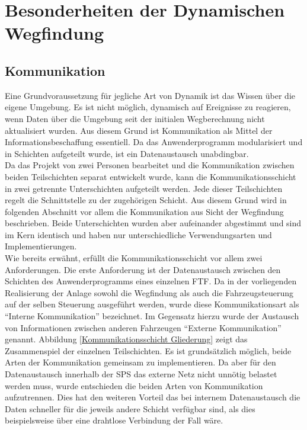 \chapter{Besonderheiten der Dynamischen Wegfindung}

\section{Kommunikation}
	\label{Kommunikation}
	Eine Grundvoraussetzung für jegliche Art von Dynamik ist das Wissen über die eigene Umgebung. Es ist nicht möglich, dynamisch auf Ereignisse zu reagieren, wenn Daten über die Umgebung seit der initialen Wegberechnung nicht aktualisiert wurden. Aus diesem Grund ist Kommunikation als Mittel der Informationsbeschaffung essentiell. Da das Anwenderprogramm modularisiert und in Schichten aufgeteilt wurde, ist ein Datenaustausch unabdingbar. 
	\\[4pt]
	Da das Projekt von zwei Personen bearbeitet und die Kommunikation zwischen beiden Teilschichten separat entwickelt wurde, kann die Kommunikationsschicht in zwei getrennte Unterschichten aufgeteilt werden. Jede dieser Teilschichten regelt die Schnittstelle zu der zugehörigen Schicht. Aus diesem Grund wird in folgenden Abschnitt vor allem die Kommunikation aus Sicht der Wegfindung beschrieben. Beide Unterschichten wurden aber aufeinander abgestimmt und sind im Kern identisch und haben nur unterschiedliche Verwendungsarten und Implementierungen.
	\\[4pt]
	Wie bereits erwähnt, erfüllt die Kommunikationsschicht vor allem zwei Anforderungen. Die erste Anforderung ist der Datenaustausch zwischen den Schichten des Anwenderprogramms eines einzelnen \ac{FTF}. Da in der vorliegenden Realisierung der Anlage sowohl die Wegfindung als auch die Fahrzeugsteuerung auf der selben Steuerung ausgeführt werden, wurde diese Kommunikationsart als "`Interne Kommunikation"' bezeichnet. Im Gegensatz hierzu wurde der Austausch von Informationen zwischen anderen Fahrzeugen "`Externe Kommunikation"' genannt. Abbildung \ref{Kommunikationsschicht Gliederung} zeigt das Zusammenspiel der einzelnen Teilschichten. Es ist grundsätzlich möglich, beide Arten der Kommunikation gemeinsam zu implementieren. Da aber für den Datenaustausch innerhalb der \ac{SPS} das externe Netz nicht unnötig belastet werden muss, wurde entschieden die beiden Arten von Kommunikation aufzutrennen. Dies hat den weiteren Vorteil das bei internem Datenaustausch die Daten schneller für die jeweils andere Schicht verfügbar sind, als dies beispielsweise über eine drahtlose Verbindung der Fall wäre.
	
